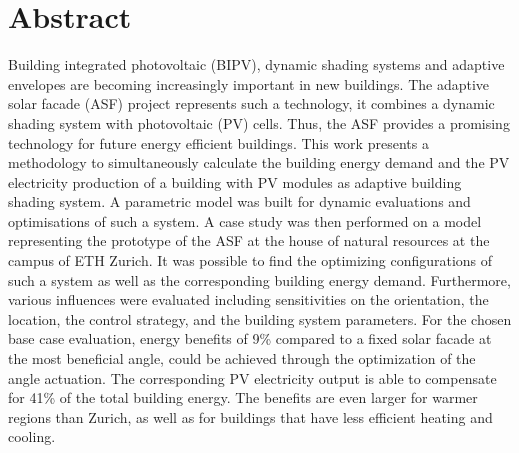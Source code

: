 \chapter*{Abstract}
Building integrated photovoltaic (BIPV), dynamic shading systems and adaptive envelopes are becoming increasingly important in new buildings. The adaptive solar facade (ASF) project represents such a technology, it combines a dynamic shading system with photovoltaic (PV) cells. Thus, the ASF provides a promising technology for future energy efficient buildings. This work presents a methodology to simultaneously calculate the building energy demand and the PV electricity production of a building with PV modules as adaptive building shading system. A parametric model was built for dynamic evaluations and optimisations of such a system. A case study was then performed on a model representing the prototype of the ASF at the house of natural resources at the campus of ETH Zurich. It was possible to find the optimizing configurations of such a system as well as the corresponding building energy demand. Furthermore, various influences were evaluated including sensitivities on the orientation, the location, the control strategy, and the building system parameters. For the chosen base case evaluation, energy benefits of 9\% compared to a fixed solar facade at the most beneficial angle, could be achieved through the optimization of the angle actuation. The corresponding PV electricity output is able to compensate for 41\% of the total building energy. The benefits are even larger for warmer regions than Zurich, as well as for buildings that have less efficient heating and cooling. 
\newpage